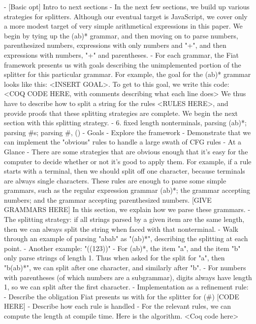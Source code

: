   - [Basic opt] Intro to next sections
    - In the next few sections, we build up various strategies for splitters.  Although our eventual target is JavaScript, we cover only a more modest target of very simple arithmetical expressions in this paper.  We begin by tying up the (ab)* grammar, and then moving on to parse numbers, parenthesized numbers, expressions with only numbers and "+", and then expressions with numbers, "+" and parentheses.
    - For each grammar, the Fiat framework presents us with goals describing the unimplemented portion of the splitter for this particular grammar.  For example, the goal for the (ab)* grammar looks like this: <INSERT GOAL>.  To get to this goal, we write this code: <COQ CODE HERE, with comments describing what each line does>  We thus have to describe how to split a string for the rules <RULES HERE>, and provide proofs that these splitting strategies are complete.  We begin the next section with this splitting strategy.
- 6. fixed length nonterminals, parsing (ab)*; parsing #s; parsing #, ()
  - Goals
    - Explore the framework
    - Demonstrate that we can implement the "obvious" rules to handle a large swath of CFG rules
  - At a Glance
    - There are some strategies that are obvious enough that it's easy for the computer to decide whether or not it's good to apply them.  For example, if a rule starts with a terminal, then we should split off one character, because terminals are always single characters.  These rules are enough to parse some simple grammars, such as the regular expression grammar (ab)*; the grammar accepting numbers; and the grammar accepting parenthesized numbers.  [GIVE GRAMMARS HERE]  In this section, we explain how we parse these grammars.
  - The splitting strategy: if all strings parsed by a given item are the same length, then we can always split the string when faced with that nonterminal.
    - Walk through an example of parsing "abab" as "(ab)*", describing the splitting at each point.
    - Another example: "((123))"
    - For (ab)*, the item "a", and the item "b" only parse strings of length 1.  Thus when asked for the split for "a", then "b(ab)*", we can split after one character, and similarly after "b". 
    - For numbers with parentheses (of which numbers are a subgrammar), digits always have length 1, so we can split after the first character.
  - Implementation as a refinement rule:
    - Describe the obligation Fiat presents us with for the splitter for (#) [CODE HERE]
    - Describe how each rule is handled
    - For the relevant rules, we can compute the length at compile time.  Here is the algorithm. <Coq code here>
